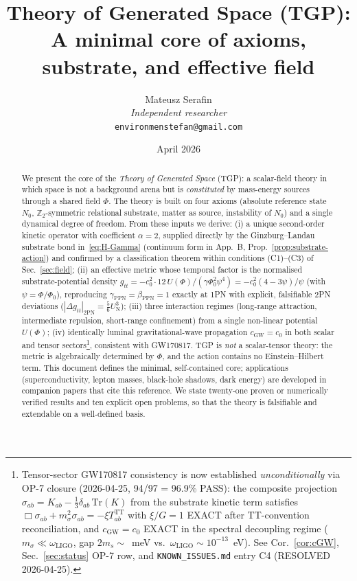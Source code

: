 \documentclass[11pt,a4paper]{article}
\title{%
  \textbf{Theory of Generated Space (TGP):}\\[4pt]
  \large A minimal core of axioms, substrate, and effective field%
}
\author{Mateusz Serafin\\[2pt]
\small\textit{Independent researcher}\\[-2pt]
\small\texttt{environmenstefan@gmail.com}}
\date{April 2026}
\renewcommand{\Phi}{\varPhi}
\newcommand{\PhiZero}{\varPhi_{0}}
\newcommand{\Nzero}{N_{0}}
\newcommand{\Zp}{\mathbb{Z}_{2}}
\begin{document}
\maketitle

\begin{abstract}
We present the core of the \emph{Theory of Generated Space} (TGP):
a scalar-field theory in which space is not a background arena but is
\emph{constituted} by mass-energy sources through a shared field $\Phi$.
The theory is built on four axioms
(absolute reference state $\Nzero$, $\Zp$-symmetric relational substrate,
matter as source, instability of $\Nzero$) and a single dynamical degree of freedom.
From these inputs we derive:
(i) a unique second-order kinetic operator with coefficient $\alpha=2$,
supplied directly by the Ginzburg--Landau substrate bond
in~\eqref{eq:H-Gamma} (continuum form in App.~B,
Prop.~\ref{prop:substrate-action}) and confirmed by a classification
theorem within conditions (C1)--(C3) of Sec.~\ref{sec:field};
(ii) an effective metric whose temporal factor is the normalised
substrate-potential density $g_{tt}=-c_{0}^{2}\cdot 12\,U(\Phi)/(\gamma\PhiZero^{2}\psi^{4})
=-c_{0}^{2}(4-3\psi)/\psi$ (with $\psi=\Phi/\PhiZero$), reproducing
$\gamma_{\mathrm{PPN}}=\beta_{\mathrm{PPN}}=1$ exactly at 1PN with explicit,
falsifiable 2PN deviations ($|\Delta g_{tt}|_{2\mathrm{PN}}=\tfrac{5}{6}U_{\mathrm{N}}^{3}$);
(iii) three interaction regimes (long-range attraction, intermediate repulsion,
short-range confinement) from a single non-linear potential $U(\Phi)$;
(iv) identically luminal gravitational-wave propagation
$c_{\mathrm{GW}}=c_{0}$ in both scalar and tensor
sectors\footnote{Tensor-sector GW170817 consistency is now
established \emph{unconditionally} via OP-7 closure
(2026-04-25, 94/97 = 96.9\% PASS): the composite projection
$\sigma_{ab} = K_{ab} - \tfrac{1}{3}\delta_{ab}\,\mathrm{Tr}(K)$
from the substrate kinetic term satisfies
$\Box \sigma_{ab} + m_\sigma^2 \sigma_{ab} = -\xi T_{ab}^{\mathrm{TT}}$
with $\xi/G = 1$ EXACT after TT-convention reconciliation, and
$c_{\mathrm{GW}} = c_0$ EXACT in the spectral decoupling regime
($m_\sigma \ll \omega_{\mathrm{LIGO}}$, gap $2 m_s \sim$~meV
vs.\ $\omega_{\mathrm{LIGO}} \sim 10^{-13}$~eV). See
Cor.~\ref{cor:cGW}, Sec.~\ref{sec:status} OP-7 row, and
\texttt{KNOWN\_ISSUES.md} entry C4 (RESOLVED 2026-04-25).},
consistent with GW170817.
TGP is \emph{not} a scalar-tensor theory: the metric is algebraically determined
by $\Phi$, and the action contains no Einstein--Hilbert term.
This document defines the minimal, self-contained core; applications
(superconductivity, lepton masses, black-hole shadows, dark energy) are
developed in companion papers that cite this reference.
We state twenty-one proven or numerically verified results and ten
explicit open problems, so that the theory is falsifiable and extendable
on a well-defined basis.
\end{abstract}
\end{document}

